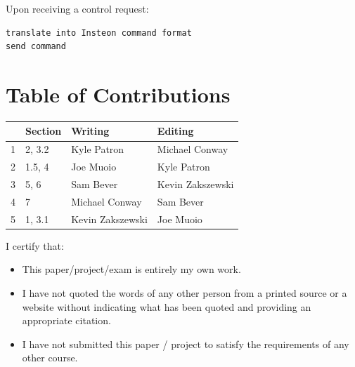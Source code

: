 \documentclass{article}
\begin{document}
Upon receiving a control request:

\begin{lstlisting}
translate into Insteon command format
send command
\end{lstlisting}

\newpage

\section*{\centering Table of Contributions}
\begin{tabular}{| l | l | l | l |}
    \hline
     & Section & Writing & Editing \\
    \hline \hline
		1 & 2, 3.2 & Kyle Patron & Michael Conway \\ \hline
		2 & 1.5, 4 & Joe Muoio & Kyle Patron \\ \hline
		3 & 5, 6 & Sam Bever &  Kevin Zakszewski \\ \hline
		4 & 7 & Michael Conway &  Sam Bever \\ \hline
		5 & 1, 3.1 & Kevin Zakszewski &  Joe Muoio \\ \hline
\end{tabular}
\newpage
\noindent I certify that:
\begin{itemize}
\item This paper/project/exam is entirely my own work.
\item I have not quoted the words of any other person from a printed source or a website without indicating what has been quoted and providing an appropriate citation.
\item I have not submitted this paper / project to satisfy the requirements of any other course.
\end{itemize}

\vspace{1cm}
\noindent{}


\vspace{0.5cm}
\noindent{}

\vspace{0.5cm}
\noindent{}

\vspace{0.5cm}
\noindent{}
\end{document}
